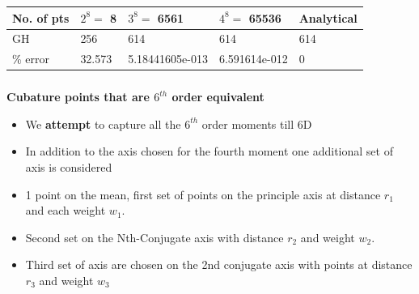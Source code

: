 \documentclass[11pt]{beamer}
\begin{document}
\begin{frame}
\tiny
\begin{center}
  \begin{tabular}{ | l | l | l | l | l | }
    \hline
  No. of pts 					      & $2^8=$ 8 					& $3^8=$ 6561 		  & $4^8=$ 65536			 & Analytical       \\ \hline 
      GH          					&   256             & 614               & 614     	         &   614           \\ \hline
   \% error             	  &   32.573   	      & 5.18441605e-013  	& 6.591614e-012      &   0         \\ 
      \hline
  \end{tabular}
\end{center} 
\end{frame}
\begin{frame}
\frametitle{ }
{\bf Cubature points that are $6^{th}$ order equivalent}\newline
\begin{itemize}[<+->]
\item We {\bf attempt} to capture all the $6^{th}$ order moments till 6D
\item In addition to the axis chosen for the fourth moment one additional set of axis is considered
\item 1 point on the mean, first set of points on the principle axis at distance $r_1$ and each weight $w_1$.
\item Second set on the Nth-Conjugate axis with distance $r_2$ and weight $w_2$.
\item Third set of axis are chosen on the 2nd conjugate axis with points at distance $r_3$ and weight $w_3$
\end{itemize}
\end{frame}
\end{document}
